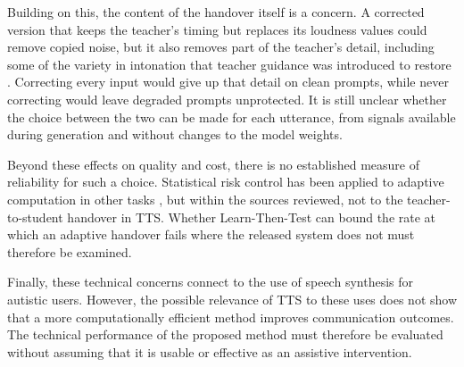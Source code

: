 Building on this, the content of the handover itself is a concern. A corrected version that keeps the teacher's timing but replaces its loudness values could remove copied noise, but it also removes part of the teacher's detail, including some of the variety in intonation that teacher guidance was introduced to restore \parencite[p.~31818]{li2025dmospeech2}. Correcting every input would give up that detail on clean prompts, while never correcting would leave degraded prompts unprotected. It is still unclear whether the choice between the two can be made for each utterance, from signals available during generation and without changes to the model weights.

Beyond these effects on quality and cost, there is no established measure of reliability for such a choice. Statistical risk control has been applied to adaptive computation in other tasks \parencite{damri2026confident,jazbec2024fast,schuster2022calm}, but within the sources reviewed, not to the teacher-to-student handover in TTS. Whether Learn-Then-Test \parencite{angelopoulos2025ltt} can bound the rate at which an adaptive handover fails where the released system does not must therefore be examined.

Finally, these technical concerns connect to the use of speech synthesis for autistic users. However, the possible relevance of TTS to these uses does not show that a more computationally efficient method improves communication outcomes. The technical performance of the proposed method must therefore be evaluated without assuming that it is usable or effective as an assistive intervention.


